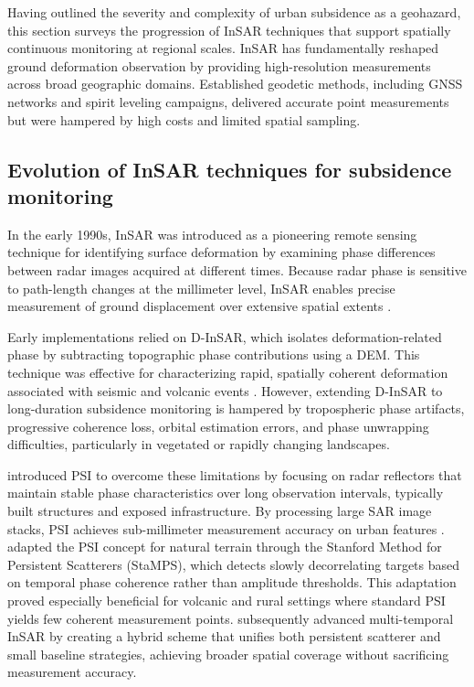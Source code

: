 \documentclass[oneside,doublespacing,flushright]{lsuthesis}
\begin{document}
Having outlined the severity and complexity of urban subsidence as a geohazard, this section surveys the progression of InSAR techniques that support spatially continuous monitoring at regional scales. InSAR has fundamentally reshaped ground deformation observation by providing high-resolution measurements across broad geographic domains. Established geodetic methods, including GNSS networks and spirit leveling campaigns, delivered accurate point measurements but were hampered by high costs and limited spatial sampling.


\subsection{Evolution of InSAR techniques for subsidence monitoring}
In the early 1990s, InSAR was introduced as a pioneering remote sensing technique for identifying surface deformation by examining phase differences between radar images acquired at different times. Because radar phase is sensitive to path-length 
changes at the millimeter level, InSAR enables precise measurement of ground displacement over extensive spatial extents \citep{Jiang2023}.

Early implementations relied on D-InSAR, which isolates deformation-related phase by subtracting topographic phase contributions using a DEM. This technique was effective for characterizing rapid, spatially coherent deformation associated with seismic and volcanic 
events \citep{Li2022}. However, extending D-InSAR to long-duration subsidence monitoring is hampered by tropospheric phase artifacts, progressive coherence loss, orbital estimation errors, and phase unwrapping difficulties, particularly 
in vegetated or rapidly changing landscapes.

\citet{Ferretti2001} introduced PSI to overcome these limitations by focusing on radar reflectors that maintain stable phase characteristics over long observation intervals, typically built structures and exposed infrastructure. 
By processing large SAR image stacks, PSI achieves sub-millimeter measurement accuracy on urban features \citep{Ferretti2001,Ferretti2011}. 
\citet{Hooper2004} adapted the PSI concept for natural terrain through the Stanford Method for Persistent Scatterers (StaMPS), which detects slowly decorrelating targets based on temporal phase coherence rather than amplitude thresholds. 
This adaptation proved especially beneficial for volcanic and rural settings where standard PSI yields few coherent measurement points. \citet{Hooper2008} subsequently advanced multi-temporal InSAR by creating a hybrid scheme that unifies both 
persistent scatterer and small baseline strategies, achieving broader spatial coverage without sacrificing measurement accuracy.
\end{document}
